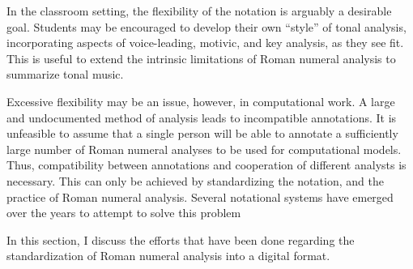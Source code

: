 In the classroom setting, the flexibility of the notation is
arguably a desirable goal. Students may be encouraged to
develop their own ``style'' of tonal analysis, incorporating
aspects of voice-leading, motivic, and key analysis, as they
see fit. This is useful to extend the intrinsic limitations
of Roman numeral analysis to summarize tonal music.

Excessive flexibility may be an issue, however, in
computational work. A large and undocumented method of
analysis leads to incompatible annotations.
It is unfeasible to assume that a single person will be able
to annotate a sufficiently large number of Roman numeral
analyses to be used for computational models. Thus,
compatibility between annotations and cooperation of
different analysts is necessary. This can only be achieved
by standardizing the notation, and the practice of Roman
numeral analysis. Several notational systems have emerged
over the years to attempt to solve this problem

In this section, I discuss the efforts that have been done
regarding the standardization of Roman numeral analysis into
a digital format.
